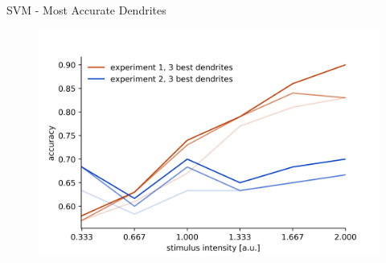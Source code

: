 \documentclass[10pt]{beamer}
\begin{document}
\begin{frame}[fragile]{SVM - Most Accurate Dendrites}

\begin{center}
	\begin{figure}
      \includegraphics[width=1.0\textwidth]{presence_single.png}
	\end{figure}
	\end{center}
\end{frame}

\end{document}

